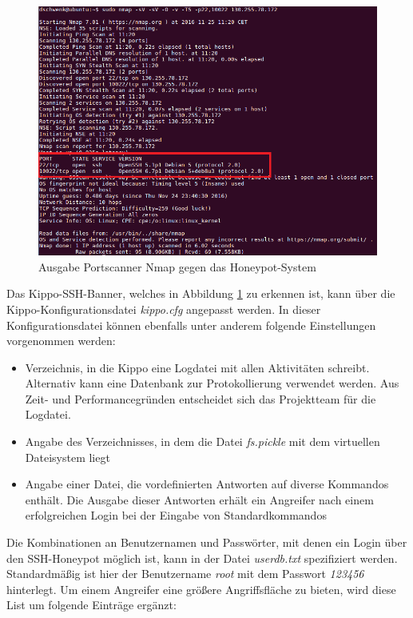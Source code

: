 \begin{figure}[ht]
	\centering
		\includegraphics[width=1.0\textwidth]{img/nmap_ssh.png}
	\caption{Ausgabe Portscanner Nmap gegen das Honeypot-System}
	\label{fig:nmap_ssh}
\end{figure}

Das Kippo-SSH-Banner, welches in Abbildung \ref{fig:nmap_ssh} zu erkennen ist, kann über die Kippo-Konfigurationsdatei \textit{kippo.cfg} angepasst werden. In dieser Konfigurationsdatei können ebenfalls unter anderem folgende Einstellungen vorgenommen werden:

\begin{itemize}
\item Verzeichnis, in die Kippo eine Logdatei mit allen Aktivitäten schreibt. Alternativ kann eine Datenbank zur Protokollierung verwendet werden. Aus Zeit- und Performancegründen entscheidet sich das Projektteam für die Logdatei.
\item Angabe des Verzeichnisses, in dem die Datei \textit{fs.pickle} mit dem virtuellen Dateisystem liegt
\item Angabe einer Datei, die vordefinierten Antworten auf diverse Kommandos enthält. Die Ausgabe dieser Antworten erhält ein Angreifer nach einem erfolgreichen Login bei der Eingabe von Standardkommandos
\end{itemize}

Die Kombinationen an Benutzernamen und Passwörter, mit denen ein Login über den SSH-Honeypot möglich ist, kann in der Datei \textit{userdb.txt} spezifiziert werden. Standardmäßig ist hier der Benutzername \textit{root} mit dem Passwort \textit{123456} hinterlegt. Um einem Angreifer eine größere Angriffsfläche zu bieten, wird diese List um folgende Einträge ergänzt:

